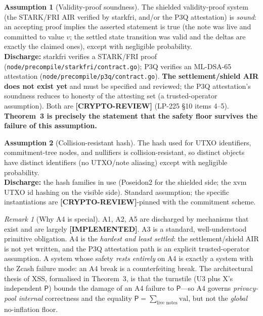 \documentclass[11pt]{article}
\theoremstyle{definition}
\newtheorem{assumption}{Assumption}
\theoremstyle{remark}
\newtheorem{remark}{Remark}
\newcommand{\IMPL}{\textbf{[IMPLEMENTED]}}
\newcommand{\CRYPTO}{\textbf{[CRYPTO-REVIEW]}}
\newcommand{\pool}{\mathsf{P}}
\begin{document}
\begin{assumption}[Validity-proof soundness]
\label{a:proof}
The shielded validity-proof system (the STARK/FRI AIR verified by starkfri,
and/or the P3Q attestation) is \emph{sound}: an accepting proof implies the
asserted statement is true (the note was live and committed to value $v$;
the settled state transition was valid and the deltas are exactly the
claimed ones), except with negligible probability.
\\\textbf{Discharge:} starkfri verifies a STARK/FRI proof
(\texttt{node/precompile/starkfri/contract.go}); P3Q verifies an ML-DSA-65
attestation (\texttt{node/precompile/p3q/contract.go}). \textbf{The
settlement/shield AIR does not exist yet} and must be specified and
reviewed; the P3Q attestation's soundness reduces to honesty of the
attesting set (a trusted-operator assumption). Both are \CRYPTO{}
(LP-225 \S10 items 4--5). \textbf{Theorem~3 is precisely the statement
that the safety floor survives the failure of this assumption.}
\end{assumption}

\begin{assumption}[Collision-resistant hash]
\label{a:hash}
The hash used for UTXO identifiers, commitment-tree nodes, and nullifiers
is collision-resistant, so distinct objects have distinct identifiers
(no UTXO/note aliasing) except with negligible probability.
\\\textbf{Discharge:} the hash families in use (Poseidon2 for the shielded
side; the xvm UTXO id hashing on the visible side). Standard assumption;
the specific instantiations are \CRYPTO{}-pinned with the commitment scheme.
\end{assumption}

\begin{remark}[Why A4 is special]
\label{rem:a4special}
A1, A2, A5 are discharged by mechanisms that exist and are largely
\IMPL{}. A3 is a standard, well-understood primitive obligation. A4 is the
\emph{hardest and least settled}: the settlement/shield AIR is not yet
written, and the P3Q attestation path is an explicit trusted-operator
assumption. A system whose safety \emph{rests entirely} on A4 is exactly a
system with the Zcash failure mode: an A4 break is a counterfeiting break.
The architectural thesis of XSS, formalised in Theorem~3, is that the
turnstile (U3 plus X's independent $\pool$) bounds the damage of an A4
failure to $\pool$---so A4 governs \emph{privacy-pool internal} correctness
and the equality $\pool = \sum_{\text{live notes}}\mathrm{val}$, but not the
\emph{global} no-inflation floor.
\end{remark}
\end{document}
